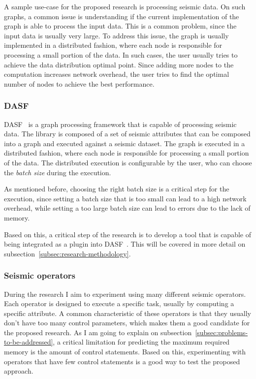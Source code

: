 A sample use-case for the proposed research is processing seismic data.
On such graphs, a common issue is understanding if the current implementation of the graph is able to process the input data.
This is a common problem, since the input data is usually very large.
To address this issue, the graph is usually implemented in a distributed fashion, where each node is responsible for processing a small portion of the data.
In such cases, the user usually tries to achieve the data distribution optimal point.
Since adding more nodes to the computation increases network overhead, the user tries to find the optimal number of nodes to achieve the best performance.

\subsubsection{DASF}
\label{subsubsec:dasf}

DASF~\cite{dasf} is a graph processing framework that is capable of processing seismic data.
The library is composed of a set of seismic attributes that can be composed into a graph and executed against a seismic dataset.
The graph is executed in a distributed fashion, where each node is responsible for processing a small portion of the data.
The distributed execution is configurable by the user, who can choose the \textit{batch size} during the execution.

As mentioned before, choosing the right batch size is a critical step for the execution, since setting a batch size that is too small can lead to a high network overhead, while setting a too large batch size can lead to errors due to the lack of memory.

Based on this, a critical step of the research is to develop a tool that is capable of being integrated as a plugin into DASF~\cite{dasf}.
This will be covered in more detail on subsection~\ref{subsec:research-methodology}.

\subsubsection{Seismic operators}
\label{subsubsec:seismic-operators}

During the research I aim to experiment using many different seismic operators.
Each operator is designed to execute a specific task, usually by computing a specific attribute.
A common characteristic of these operators is that they usually don't have too many control parameters, which makes them a good candidate for the proposed research.
As I am going to explain on subsection~\ref{subsec:problems-to-be-addressed}, a critical limitation for predicting the maximum required memory is the amount of control statements.
Based on this, experimenting with operators that have few control statements is a good way to test the proposed approach.

